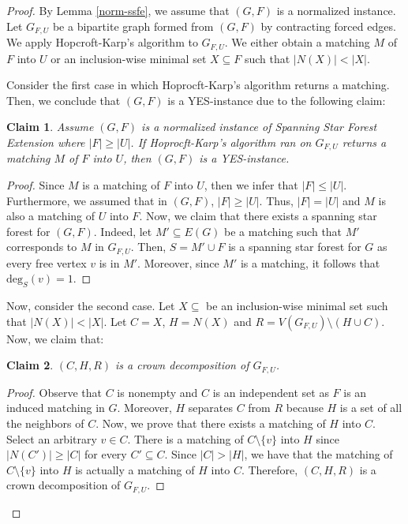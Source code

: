 \documentclass[en]{pracamgr}
\newtheorem{claim}{Claim}
\theoremstyle{definition}
\newcommand{\ssfep}{{\sc Spanning Star Forest Extension}}
\newcommand{\degree}[2]{\textrm{deg}_{#1}(#2)}
\begin{document}
\begin{proof}
	By Lemma \ref{norm-ssfe}, we assume that $(G,F)$ is a normalized instance. Let $G_{F,U}$ be a bipartite graph formed from $(G,F)$ by contracting forced edges. We apply Hopcroft-Karp's algorithm to $G_{F,U}$. We either obtain a matching $M$ of $F$ into $U$ or an inclusion-wise minimal set $X \subseteq F$ such that $|N(X)| < |X|$.

	Consider the first case in which Hoprocft-Karp's algorithm returns a matching. Then, we conclude that $(G,F)$ is a YES-instance due to the following claim:
	\begin{claim}
		Assume $(G,F)$ is a normalized instance of \ssfep{} where $|F| \geq |U|$. If Hoprocft-Karp's algorithm ran on $G_{F,U}$ returns a matching $M$ of $F$ into $U$, then $(G,F)$ is a YES-instance.
	\end{claim}

	\begin{proof}
		Since $M$ is a matching of $F$ into $U$, then we infer that $|F| \leq |U|$. Furthermore, we assumed that in $(G,F)$, $|F| \geq |U|$. Thus, $|F|=|U|$ and $M$ is also a matching of $U$ into $F$. Now, we claim that there exists a spanning star forest for $(G,F)$. Indeed, let $M' \subseteq E(G)$ be a matching such that $M'$ corresponds to $M$ in $G_{F,U}$. Then, $S = M' \cup F$ is a spanning star forest for $G$ as every free vertex $v$ is in $M'$. Moreover, since $M'$ is a matching, it follows that $\degree{S}{v}=1$.
	\end{proof}

	Now, consider the second case. Let $X \subseteq$ be an inclusion-wise minimal set such that $|N(X)| < |X|$. Let $C=X$, $H=N(X)$ and $R= V(G_{F,U}) \setminus (H \cup C)$. Now, we claim that:
	\begin{claim}
		$(C,H,R)$ is a crown decomposition of $G_{F,U}$.
	\end{claim}
	\begin{proof}
		Observe that $C$ is nonempty and $C$ is an independent set as $F$ is an induced matching in $G$. Moreover, $H$ separates $C$ from $R$ because $H$ is a set of all the neighbors of $C$. Now, we prove that there exists a matching of $H$ into $C$. Select an arbitrary $v \in C$. There is a matching of $C \setminus \{v\}$ into $H$ since $|N(C')| \geq |C|$ for every $C' \subseteq C$. Since $|C| > |H|$, we have that the matching of $C \setminus \{v\}$ into $H$ is actually a matching of $H$ into $C$. Therefore, $(C,H,R)$ is a crown decomposition of $G_{F,U}$.
	\end{proof}


\end{proof}
\end{document}
